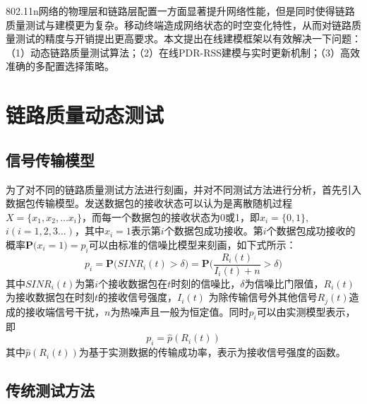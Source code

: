 \begin{figure}[!htp]
\centering
    \hspace{1cm}
\end{figure}

802.11n网络的物理层和链路层配置一方面显著提升网络性能，但是同时使得链路质量测试与建模更为复杂。移动终端造成网络状态的时空变化特性，从而对链路质量测试的精度与开销提出更高要求。本文提出在线建模框架以有效解决一下问题：（1）动态链路质量测试算法；（2）在线PDR-RSS建模与实时更新机制；（3）高效准确的多配置选择策略。

\section{链路质量动态测试}
\label{sec:measure}

\subsection{信号传输模型}
\label{sec:packetmodel}

为了对不同的链路质量测试方法进行刻画，并对不同测试方法进行分析，首先引入数据包传输模型。发送数据包的接收状态可以认为是离散随机过程$X=\{x_1, x_2, ... x_i\}$，而每一个数据包的接收状态为0或1，即$x_i=\{0, 1\}$, $i(i=1,2,3...)$，其中$x_i=1$表示第$i$个数据包成功接收。第$i$个数据包成功接收的概率$\textbf{P(}x_i=1\textbf{)}=p_i$可以由标准的信噪比模型来刻画，如下式所示：
\begin{equation}
 p_i=\textbf{P(}SINR_i(t)>\delta\textbf{)}=\textbf{P(}\frac{R_i(t)}{I_i(t)+n}>\delta\textbf{)}
\label{equa:p_i}
\end{equation}
其中$SINR_i(t)$为第$i$个接收数据包在$t$时刻的信噪比，$\delta$为信噪比门限值，$R_i(t)$为接收数据包在时刻$t$的接收信号强度，$I_i(t)$ 为除传输信号外其他信号$R_j(t)$造成的接收端信号干扰，$n$为热噪声且一般为恒定值。同时$p_i$可以由实测模型表示，即
\begin{equation}
 p_i=\hat{p}(R_i(t))
\label{equa:p_i_measure}
\end{equation}
其中$\hat{p}(R_i(t))$为基于实测数据的传输成功率，表示为接收信号强度的函数。

\subsection{传统测试方法}
\label{sec:traditional}

